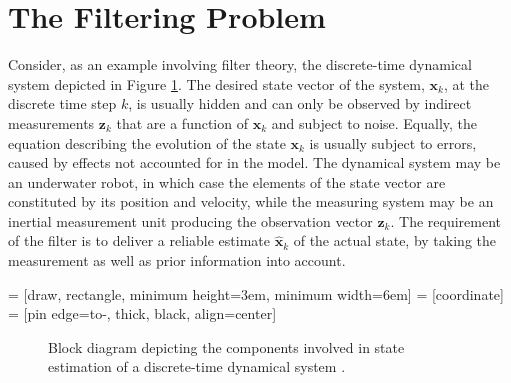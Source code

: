 \section{The Filtering Problem}

Consider, as an example involving filter theory, the discrete-time dynamical system depicted in Figure \ref{fig:state_estimation}. The desired state vector of the system, $\bm{x}_k$, at the discrete time step $k$, is usually hidden and can only be observed by indirect measurements $\bm{z}_k$ that are a function of $\bm{x}_k$ and subject to noise. Equally, the equation describing the evolution of the state $\bm{x}_k$ is usually subject to errors, caused by effects not accounted for in the model. The dynamical system may be an underwater robot, in which case the elements of the state vector are constituted by its position and velocity, while the measuring system may be an inertial measurement unit producing the observation vector $\bm{z}_k$. The requirement of the filter is to deliver a reliable estimate $\hat{\bm{x}}_k$ of the actual state, by taking the measurement as well as prior information into account.

 = [draw, rectangle, minimum height=3em, minimum width=6em]
 = [coordinate]
 = [pin edge={to-, thick, black}, align=center]

\begin{figure}[]
\centering
{}
\caption[Block diagram depicting the components involved in state estimation of a discrete-time dynamical system.]{Block diagram depicting the components involved in state estimation of a discrete-time dynamical system \cite{haykin2013adaptive}.} \label{fig:state_estimation}
\end{figure}

